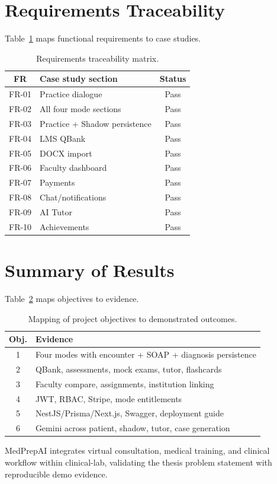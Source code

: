 \section{Requirements Traceability}
Table~\ref{tab:traceability} maps functional requirements to case studies.

\begin{table}[htbp]
  \centering
  \caption{Requirements traceability matrix.}
  \label{tab:traceability}
  \footnotesize
  \begin{tabular}{@{}clc@{}}
    \toprule
    \textbf{FR} & \textbf{Case study section} & \textbf{Status} \\
    \midrule
    FR-01 & Practice dialogue & Pass \\
    FR-02 & All four mode sections & Pass \\
    FR-03 & Practice + Shadow persistence & Pass \\
    FR-04 & LMS QBank & Pass \\
    FR-05 & DOCX import & Pass \\
    FR-06 & Faculty dashboard & Pass \\
    FR-07 & Payments & Pass \\
    FR-08 & Chat/notifications & Pass \\
    FR-09 & AI Tutor & Pass \\
    FR-10 & Achievements & Pass \\
    \bottomrule
  \end{tabular}
\end{table}

\section{Summary of Results}
Table~\ref{tab:results-summary} maps objectives to evidence.

\begin{table}[htbp]
  \centering
  \caption{Mapping of project objectives to demonstrated outcomes.}
  \label{tab:results-summary}
  \begin{tabular}{@{}cp{9.5cm}@{}}
    \toprule
    \textbf{Obj.} & \textbf{Evidence} \\
    \midrule
    1 & Four modes with encounter + SOAP + diagnosis persistence \\
    2 & QBank, assessments, mock exams, tutor, flashcards \\
    3 & Faculty compare, assignments, institution linking \\
    4 & JWT, RBAC, Stripe, mode entitlements \\
    5 & NestJS/Prisma/Next.js, Swagger, deployment guide \\
    6 & Gemini across patient, shadow, tutor, case generation \\
    \bottomrule
  \end{tabular}
\end{table}

MedPrepAI integrates virtual consultation, medical training, and clinical workflow within clinical-lab, validating the thesis problem statement with reproducible demo evidence.
